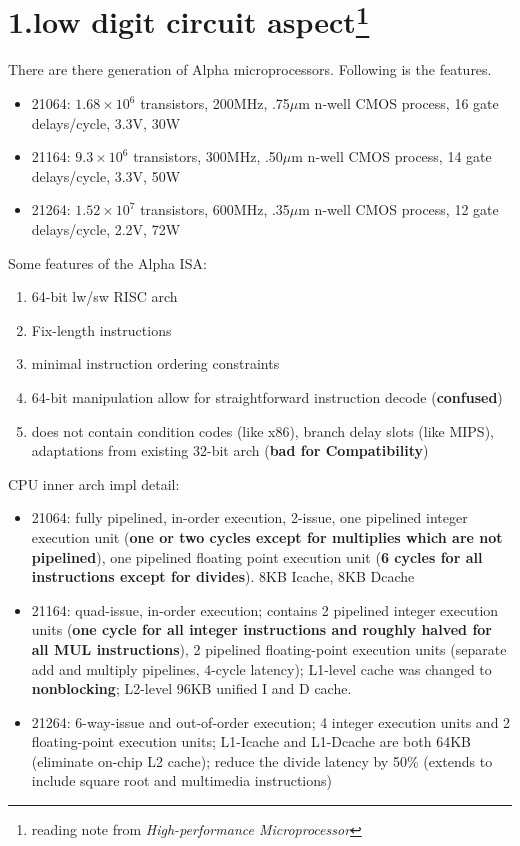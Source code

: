 \documentclass[11pt]{article}
\begin{document}
\section*{1.low digit circuit aspect\footnote{reading note from \textit{High-performance Microprocessor}}}
There are there generation of Alpha microprocessors. Following is the features.
\begin{itemize}
	\item 21064: $1.68\times10^6$ transistors, 200MHz, .75$ \mu $m n-well CMOS process, 16 gate delays/cycle, 3.3V, 30W
	\item 21164: $9.3\times10^6$ transistors, 300MHz, .50$ \mu $m n-well CMOS process, 14 gate delays/cycle, 3.3V, 50W
	\item 21264: $1.52\times10^7$ transistors, 600MHz, .35$ \mu $m n-well CMOS process, 12 gate delays/cycle, 2.2V, 72W
\end{itemize}
Some features of the Alpha ISA:
\renewcommand{\labelenumi}{\roman{enumi}}
\begin{enumerate}
	\item 64-bit lw/sw RISC arch 
	\item Fix-length instructions
	\item minimal instruction ordering constraints
	\item 64-bit manipulation allow for straightforward instruction decode (\textbf{confused}) 
	\item does not contain condition codes (like x86), branch delay slots (like MIPS), adaptations from existing 32-bit arch (\textbf{bad for Compatibility})
\end{enumerate}
CPU inner arch impl detail:
\begin{itemize}
	\item 21064: fully pipelined, in-order execution, 2-issue, one pipelined integer execution unit (\textbf{one or two cycles except for multiplies which are not pipelined}), one pipelined floating point execution unit (\textbf{6 cycles for all instructions except for divides}). 8KB Icache, 8KB Dcache
	\item 21164: quad-issue, in-order execution; contains 2 pipelined integer execution units (\textbf{one cycle for all integer instructions and roughly halved for all MUL instructions}), 2 pipelined floating-point execution units (separate add and multiply pipelines, 4-cycle latency); L1-level cache was changed to \textbf{nonblocking}; L2-level 96KB unified I and D cache.
	\item 21264: 6-way-issue and out-of-order execution; 4 integer execution units and 2 floating-point execution units; L1-Icache and L1-Dcache are both 64KB (eliminate on-chip L2 cache); reduce the divide latency by 50\% (extends to include square root and multimedia instructions)
\end{itemize}
\end{document}
